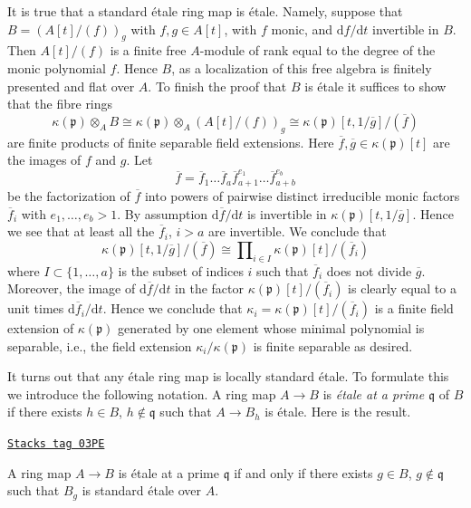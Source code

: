 It is true that a standard \'etale ring map is \'etale. Namely, suppose
that $B = \left(A[t]/(f)\right)_g$ with $f, g \in A[t]$, with $f$ monic,
and $\text{d}f/\text{d}t$ invertible in $B$. Then $A[t]/(f)$ is a finite
free $A$-module of rank equal to the degree of the monic polynomial $f$.
Hence $B$, as a localization of this free algebra is finitely presented
and flat over $A$. To finish the proof that $B$ is \'etale it suffices
to show that the fibre rings
$$
\kappa(\mathfrak p) \otimes_A B
\cong
\kappa(\mathfrak p) \otimes_A (A[t]/(f))_g
\cong
\kappa(\mathfrak p)[t, 1/\overline{g}]/(\overline{f})
$$
are finite products of finite separable field extensions.
Here $\overline{f}, \overline{g} \in \kappa(\mathfrak p)[t]$ are
the images of $f$ and $g$. Let
$$
\overline{f} = \overline{f}_1 \ldots \overline{f}_a
\overline{f}_{a + 1}^{e_1} \ldots \overline{f}_{a + b}^{e_b}
$$
be the factorization of $\overline{f}$ into powers of pairwise distinct
irreducible monic factors $\overline{f}_i$ with $e_1, \ldots, e_b > 1$.
By assumption $\text{d}\overline{f}/\text{d}t$ is invertible in
$\kappa(\mathfrak p)[t, 1/\overline{g}]$. Hence we see that
at least all the $\overline{f}_i$, $i > a$ are invertible. We conclude
that
$$
\kappa(\mathfrak p)[t, 1/\overline{g}]/(\overline{f})
\cong
\prod\nolimits_{i \in I} \kappa(\mathfrak p)[t]/(\overline{f}_i)
$$
where $I \subset \{1, \ldots, a\}$ is the subset of indices $i$ such that
$\overline{f}_i$ does not divide $\overline{g}$. Moreover, the image of
$\text{d}\overline{f}/\text{d}t$ in the factor
$\kappa(\mathfrak p)[t]/(\overline{f}_i)$ is clearly equal to a
unit times $\text{d}\overline{f}_i/\text{d}t$. Hence we conclude that
$\kappa_i = \kappa(\mathfrak p)[t]/(\overline{f}_i)$ is a finite field
extension of $\kappa(\mathfrak p)$ generated by one element whose
minimal polynomial is separable, i.e., the field extension
$\kappa_i/\kappa(\mathfrak p)$ is finite separable as desired.

\medskip\noindent
It turns out that any \'etale ring map is locally standard \'etale.
To formulate this we introduce the following notation.
A ring map $A \to B$ is {\it \'etale at a prime $\mathfrak q$} of $B$ if there
exists $h \in B$, $h \not \in \mathfrak q$ such that $A \to B_h$ is \'etale.
Here is the result.

\begin{theorem}
\label{etale-cohomology-theorem-standard-etale}
\href{https://stacks.math.columbia.edu/tag/03PE}{\texttt{Stacks tag 03PE}}

A ring map $A \to B$ is \'etale at a prime $\mathfrak q$ if and only if there
exists $g \in B$, $g \not \in \mathfrak q$ such that $B_g$ is standard
\'etale over $A$.
\end{theorem}

